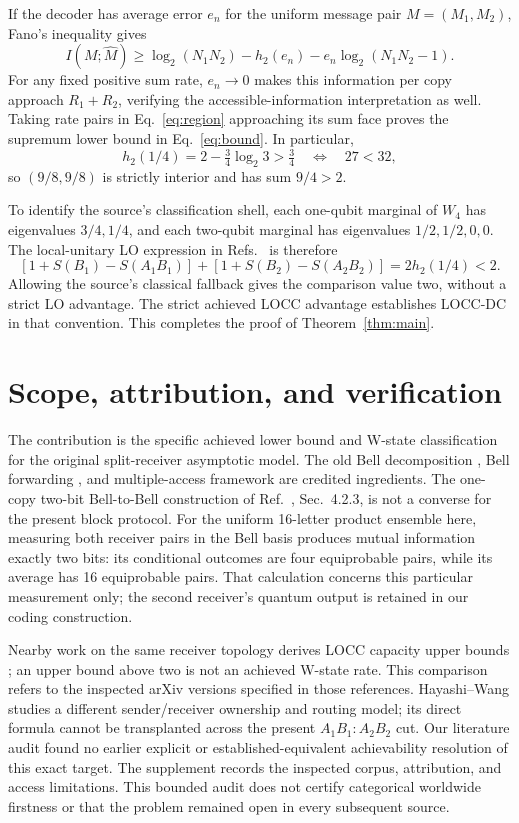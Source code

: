 \documentclass[11pt]{article}
\newcommand{\hbin}{h_2}
\begin{document}
If the decoder has average error $e_n$ for the uniform message pair
$M=(M_1,M_2)$, Fano's inequality gives
\begin{equation}\label{eq:fano}
 I(M;\widehat M)\geq\log_2(N_1N_2)-\hbin(e_n)
                         -e_n\log_2(N_1N_2-1).
\end{equation}
For any fixed positive sum rate, $e_n\to0$ makes this information per copy
approach $R_1+R_2$, verifying the accessible-information interpretation as
well. Taking rate pairs in Eq.~\eqref{eq:region} approaching its sum face
proves the supremum lower bound in Eq.~\eqref{eq:bound}. In particular,
\[
 \hbin(1/4)=2-\tfrac34\log_2 3>\tfrac34
 \quad\Longleftrightarrow\quad 27<32,
\]
so $(9/8,9/8)$ is strictly interior and has sum $9/4>2$.

To identify the source's classification shell, each one-qubit marginal of
$W_4$ has eigenvalues $3/4,1/4$, and each two-qubit marginal has eigenvalues
$1/2,1/2,0,0$. The local-unitary LO expression in
Refs.~\cite{bruss2004,bruss2006} is therefore
\[
 [1+S(B_1)-S(A_1B_1)]+[1+S(B_2)-S(A_2B_2)]
       =2\hbin(1/4)<2.
\]
Allowing the source's classical fallback gives the comparison value two,
without a strict LO advantage. The strict achieved LOCC advantage establishes
LOCC-DC in that convention. This completes the proof of Theorem~\ref{thm:main}.

\section{Scope, attribution, and verification}
The contribution is the specific achieved lower bound and W-state
classification for the original split-receiver asymptotic model.
The old Bell decomposition \cite{cao}, Bell forwarding \cite{pradhan},
and multiple-access framework \cite{huang,winter} are credited ingredients.
The one-copy two-bit Bell-to-Bell construction of Ref.~\cite{pradhan},
Sec.~4.2.3, is not a converse for the present block protocol. For the uniform
16-letter product ensemble here, measuring both receiver pairs in the Bell
basis produces mutual information exactly two bits: its conditional outcomes
are four equiprobable pairs, while its average has 16 equiprobable pairs.
That calculation concerns this particular measurement only; the second
receiver's quantum output is retained in our coding construction.

Nearby work on the same receiver topology derives LOCC capacity upper bounds
\cite{das,muhuri}; an upper bound above two is not an achieved W-state rate.
This comparison refers to the inspected arXiv versions specified in those
references. Hayashi--Wang \cite{hayashi} studies a different sender/receiver
ownership and routing model; its direct formula cannot be transplanted across
the present $A_1B_1:A_2B_2$ cut. Our literature audit found no earlier explicit
or established-equivalent achievability resolution of this exact target.
The supplement records the inspected corpus, attribution, and access
limitations. This bounded audit does not certify categorical worldwide
firstness or that the problem remained open in every subsequent source.
\end{document}
